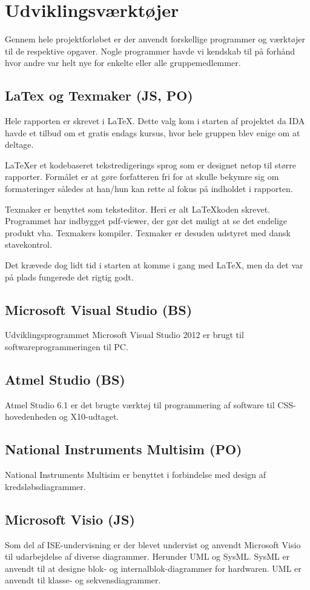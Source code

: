 \chapter{Udviklingsværktøjer}
Gennem hele projektforløbet er der anvendt forskellige programmer og værktøjer til de respektive opgaver. Nogle programmer havde vi kendskab til på forhånd hvor andre var helt nye for enkelte eller alle gruppemedlemmer.

\section{LaTex og Texmaker (JS, PO)}
Hele rapporten er skrevet i \LaTeX. Dette valg kom i starten af projektet da IDA havde et tilbud om et gratis endags kursus, hvor hele gruppen blev enige om at deltage. 

\LaTeX er et kodebaseret tekstredigerings sprog som er designet netop til større rapporter. Formålet er at gøre forfatteren fri for at skulle bekymre sig om formateringer således at han/hun kan rette al fokus på indholdet i rapporten.

Texmaker er benyttet som teksteditor. Heri er alt \LaTeX koden skrevet. Programmet har indbygget pdf-viewer, der gør det muligt at se det endelige produkt vha. Texmakers kompiler. Texmaker er desuden udstyret med dansk stavekontrol.

Det krævede dog lidt tid i starten at komme i gang med \LaTeX, men da det var på plads fungerede det rigtig godt. 

\section{Microsoft Visual Studio (BS)}
Udviklingsprogrammet Microsoft Visual Studio 2012 er brugt til softwareprogrammeringen til PC.

\section{Atmel Studio (BS)}
Atmel Studio 6.1 er det brugte værktøj til programmering af software til CSS-hovedenheden og X10-udtaget.

\section{National Instruments Multisim (PO)}
National Instruments Multisim er benyttet i forbindelse med design af kredsløbsdiagrammer. 

\section{Microsoft Visio (JS)} %
Som del af ISE-undervisning er der blevet undervist og anvendt Microsoft Visio til udarbejdelse af diverse diagrammer. Herunder UML og SysML. SysML er anvendt til at designe blok- og internalblok-diagrammer for hardwaren. UML er anvendt til klasse- og sekvensdiagrammer. 

